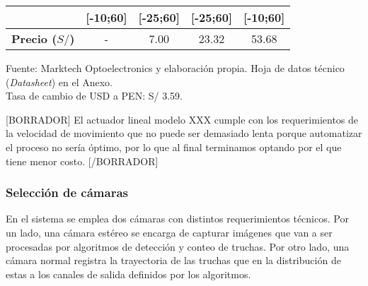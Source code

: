 \begin{mytable}[H]
\begin{tabular}{l|c|c|c|c|}
{		} & [-10;60] & [-25;60] & [-25;60] & [-10;60] \\ \hline
		\multicolumn{1}{|l|}{
			\begin{minipage}{\myforthmaxsizeofcontenttable}	
				\textbf{Precio ($S/$)}
			\end{minipage}
		} & - & 7.00 & 23.32 & 53.68 \\ \hline
	\end{tabular}
	\begin{flushleft}	
		Fuente: Marktech Optoelectronics y elaboración propia. Hoja de datos técnico (\textit{Datasheet}) en el Anexo.\\
		Tasa de cambio de USD a PEN: S/ 3.59.
	\end{flushleft}
\end{mytable}

[BORRADOR] El actuador lineal modelo XXX cumple con los requerimientos de la velocidad de movimiento que no puede ser demasiado lenta porque automatizar el proceso no sería óptimo, por lo que al final terminamos optando por el que tiene menor costo. [/BORRADOR]

\subsubsection{Selección de cámaras} 

En el sistema se emplea dos cámaras con distintos requerimientos técnicos. Por un lado, una cámara estéreo se encarga de capturar imágenes que van a ser procesadas por algoritmos de detección y conteo de truchas. Por otro lado, una cámara normal registra la trayectoria de las truchas que en la distribución de estas a los canales de salida definidos por los algoritmos. 

